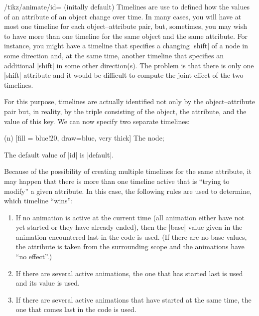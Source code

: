 \label{section-anim-def-id}

\begin{key}{/tikz/animate/id= (initally default)}
  Timelines are use to defined how the values of an attribute of an
  object change over time. In many cases, you will have at most one
  timeline for each object--attribute pair, but, sometimes, you may
  wish to have more than one timeline for the same object and the same
  attribute. For instance, you might have a timeline that specifies
  a changing |shift| of a node in some direction and, at the same
  time, another timeline that specifies an additional |shift| in some
  other direction(s). The problem is that there is only one |shift|
  attribute and it would be difficult to compute the joint effect of
  the two timelines.

  For this purpose, timelines are actually identified not only by the
  object--attribute pair but, in reality, by the triple consisting of
  the object, the attribute, and the value of this key. We can now
  specify two separate timelines:

\begin{codeexample}[animation list={0.5,1,1.5,2}]
\tikz [animate = {
  id = 1, n:shift = { 0s = "{(0,0)}", 2s = "{(0,5mm)}", begin on = click },
  id = 2, n:shift = { 0s = "{(0,0)}", 2s = "{(5mm,0)}", begin on = click }
}] 
  \node (n) [fill = blue!20, draw=blue, very thick] {The node}; 
\end{codeexample}

  The default value of |id| is |default|. 
\end{key}

Because of the possibility of creating multiple timelines for the same
attribute, it may happen that there is more than one timeline active
that is ``trying to modify'' a given attribute. In this case, the
following rules are used to determine, which timeline ``wins'': 

\begin{enumerate}
\item If no animation is active at the current time (all animation
  either have not yet started or they have already ended), then the
  |base| value given in the animation encountered last in the code is
  used. (If there are no base values, the attribute is taken from the
  surrounding scope and the animations have ``no effect''.)
\item If there are several active animations, the one that has started
  last is used and its value is used.
\item If there are several active animations that have started at the
  same time, the one that comes last in the code is used.
\end{enumerate}

